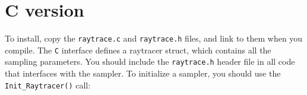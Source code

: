 \documentclass[12pt]{article}
\begin{document}
\section{C version}



To install, copy the \texttt{raytrace.c} and \texttt{raytrace.h} files, and link to them when you compile.  The \texttt{C} interface defines a raytracer struct, which contains all the sampling parameters.  You should include the \texttt{raytrace.h} header file in all code that interfaces with the sampler.  To initialize a sampler, you should use the \lstinline{Init_Raytracer()} call:
\end{document}
